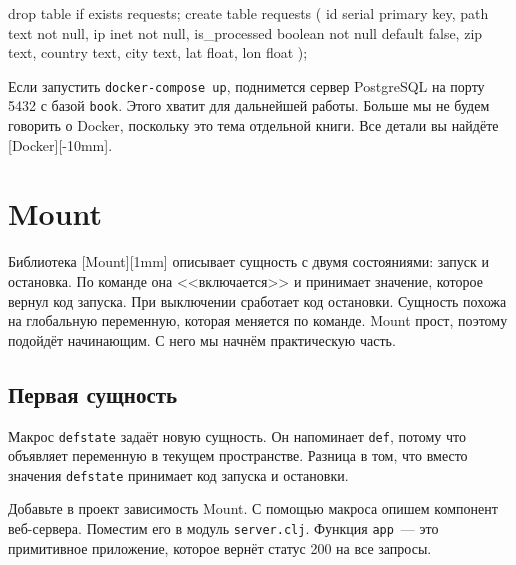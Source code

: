 \else

\begin{english}
  \begin{sql}
drop table if exists requests;
create table requests (
    id            serial primary key,
    path          text not null,
    ip            inet not null,
    is_processed  boolean not null default false,
    zip           text,
    country       text,
    city          text,
    lat           float,
    lon           float
);
  \end{sql}
\end{english}

\fi

Если запустить \verb|docker-compose up|, поднимется сервер PostgreSQL на порту
5432 с базой \verb|book|. Этого хватит для дальнейшей работы. Больше мы не
будем говорить о Docker, поскольку это тема отдельной книги. Все детали вы
найдёте [Docker][-10mm].

\section{Mount}


Библиотека [Mount][1mm] описывает сущность с
двумя состояниями: запуск и остановка. По команде она <<включается>> и принимает
значение, которое вернул код запуска. При выключении сработает код
остановки. Сущность похожа на глобальную переменную, которая меняется по
команде. Mount прост, поэтому подойдёт начинающим. С него мы начнём
практическую часть.

\subsection{Первая сущность}


Макрос \verb|defstate| задаёт новую сущность. Он напоминает \verb|def|,
потому что объявляет переменную в текущем пространстве. Разница в том, что
вместо значения \verb|defstate| принимает код запуска и остановки.

Добавьте в проект зависимость Mount. С помощью макроса опишем компонент
веб-сервера. Поместим его в модуль \verb|server.clj|. Функция \verb|app|~--- это
примитивное приложение, которое вернёт статус 200 на все запросы.

\ifx\DEVICETYPE\MOBILE

